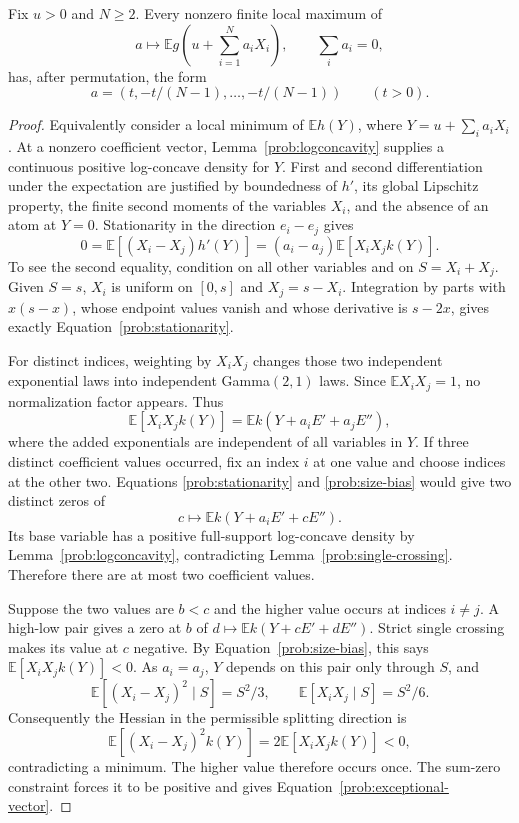 \begin{lemma}\label{prob:critical-points}
Fix $u>0$ and $N\ge2$. Every nonzero finite local maximum of
\[
 a\longmapsto\mathbb E g\left(u+\sum_{i=1}^N a_iX_i\right),
 \qquad \sum_i a_i=0,
\]
has, after permutation, the form
\begin{equation}\label{prob:exceptional-vector}
 a=(t,-t/(N-1),\ldots,-t/(N-1))\qquad(t>0).
\end{equation}
\end{lemma}

\begin{proof}
Equivalently consider a local minimum of $\mathbb Eh(Y)$, where
$Y=u+\sum_i a_iX_i$. At a nonzero coefficient vector,
Lemma~\ref{prob:logconcavity} supplies a continuous positive
log-concave density for $Y$. First and second differentiation under the
expectation are justified by boundedness of $h'$, its global Lipschitz
property, the finite second moments of the variables $X_i$, and the absence of an atom at $Y=0$.
Stationarity in the direction $e_i-e_j$ gives
\begin{equation}\label{prob:stationarity}
 0=\mathbb E[(X_i-X_j)h'(Y)]
   =(a_i-a_j)\mathbb E[X_iX_jk(Y)].
\end{equation}
To see the second equality, condition on all other variables and on
$S=X_i+X_j$. Given $S=s$, $X_i$ is uniform on $[0,s]$ and
$X_j=s-X_i$. Integration by parts with $x(s-x)$, whose endpoint
values vanish and whose derivative is $s-2x$, gives exactly
Equation~\eqref{prob:stationarity}.

For distinct indices, weighting by $X_iX_j$ changes those two
independent exponential laws into independent Gamma$(2,1)$ laws. Since
$\mathbb E X_iX_j=1$, no normalization factor appears. Thus
\begin{equation}\label{prob:size-bias}
 \mathbb E[X_iX_jk(Y)]
   =\mathbb E k(Y+a_iE'+a_jE''),
\end{equation}
where the added exponentials are independent of all variables in $Y$.
If three distinct coefficient values occurred, fix an index $i$ at
one value and choose indices at the other two. Equations
\eqref{prob:stationarity} and \eqref{prob:size-bias} would give two
distinct zeros of
\[
 c\longmapsto\mathbb E k(Y+a_iE'+cE'').
\]
Its base variable has a positive full-support log-concave density by
Lemma~\ref{prob:logconcavity}, contradicting
Lemma~\ref{prob:single-crossing}. Therefore there are at most two
coefficient values.

Suppose the two values are $b<c$ and the higher value occurs at
indices $i\ne j$. A high-low pair gives a zero at $b$ of
$d\mapsto\mathbb E k(Y+cE'+dE'')$. Strict single crossing makes its
value at $c$ negative. By Equation~\eqref{prob:size-bias}, this says
$\mathbb E[X_iX_jk(Y)]<0$. As $a_i=a_j$, $Y$ depends on this pair only
through $S$, and
\[
 \mathbb E[(X_i-X_j)^2\mid S]=S^2/3,
 \qquad \mathbb E[X_iX_j\mid S]=S^2/6.
\]
Consequently the Hessian in the permissible splitting direction is
\[
 \mathbb E[(X_i-X_j)^2k(Y)]
       =2\mathbb E[X_iX_jk(Y)]<0,
\]
contradicting a minimum. The higher value therefore occurs once.
The sum-zero constraint forces it to be positive and gives
Equation~\eqref{prob:exceptional-vector}.
\end{proof}

